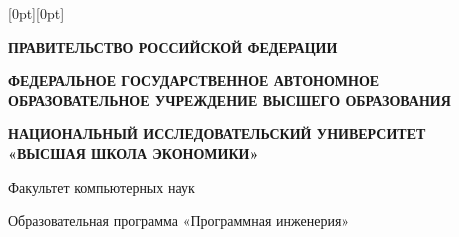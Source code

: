 \thispagestyle{approval}
\enlargethispage{3cm}
\begingroup
\hseApprovalTight

\noindent
\raisebox{-25cm}[0pt][0pt]{%
%
}%

\begin{center}
\textbf{ПРАВИТЕЛЬСТВО РОССИЙСКОЙ ФЕДЕРАЦИИ}

\textbf{ФЕДЕРАЛЬНОЕ ГОСУДАРСТВЕННОЕ АВТОНОМНОЕ\\
ОБРАЗОВАТЕЛЬНОЕ УЧРЕЖДЕНИЕ ВЫСШЕГО ОБРАЗОВАНИЯ}

\textbf{НАЦИОНАЛЬНЫЙ ИССЛЕДОВАТЕЛЬСКИЙ УНИВЕРСИТЕТ\\
«ВЫСШАЯ ШКОЛА ЭКОНОМИКИ»}

\hseFormGap{0.2cm}

\small
Факультет компьютерных наук

Образовательная программа «Программная инженерия»
\end{center}

\hseFormGap{0.3cm}

